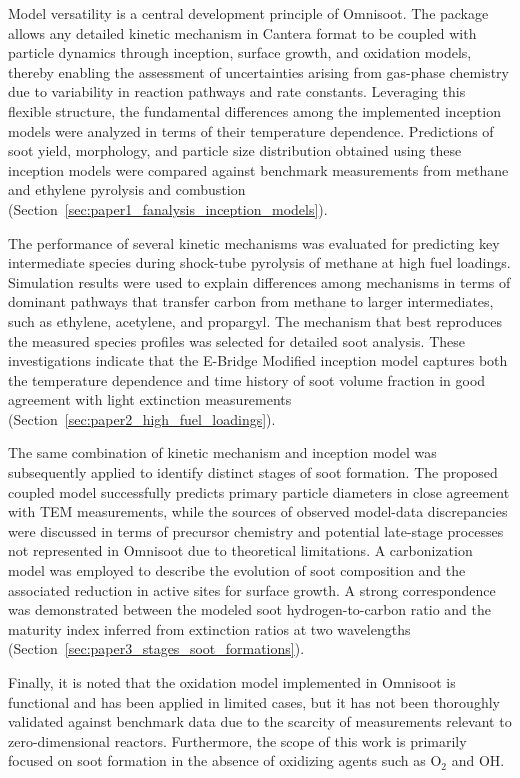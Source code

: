 Model versatility is a central development principle of Omnisoot. The package allows any detailed kinetic mechanism in Cantera format to be coupled with particle dynamics through inception, surface growth, and oxidation models, thereby enabling the assessment of uncertainties arising from gas-phase chemistry due to variability in reaction pathways and rate constants. Leveraging this flexible structure, the fundamental differences among the implemented inception models were analyzed in terms of their temperature dependence. Predictions of soot yield, morphology, and particle size distribution obtained using these inception models were compared against benchmark measurements from methane and ethylene pyrolysis and combustion (Section~\ref{sec:paper1_fanalysis_inception_models}).

The performance of several kinetic mechanisms was evaluated for predicting key intermediate species during shock-tube pyrolysis of methane at high fuel loadings. Simulation results were used to explain differences among mechanisms in terms of dominant pathways that transfer carbon from methane to larger intermediates, such as ethylene, acetylene, and propargyl. The mechanism that best reproduces the measured species profiles was selected for detailed soot analysis. These investigations indicate that the E-Bridge Modified inception model captures both the temperature dependence and time history of soot volume fraction in good agreement with light extinction measurements (Section~\ref{sec:paper2_high_fuel_loadings}).

The same combination of kinetic mechanism and inception model was subsequently applied to identify distinct stages of soot formation. The proposed coupled model successfully predicts primary particle diameters in close agreement with TEM measurements, while the sources of observed model-data discrepancies were discussed in terms of precursor chemistry and potential late-stage processes not represented in Omnisoot due to theoretical limitations. A carbonization model was employed to describe the evolution of soot composition and the associated reduction in active sites for surface growth. A strong correspondence was demonstrated between the modeled soot hydrogen-to-carbon ratio and the maturity index inferred from extinction ratios at two wavelengths (Section~\ref{sec:paper3_stages_soot_formations}).

Finally, it is noted that the oxidation model implemented in Omnisoot is functional and has been applied in limited cases, but it has not been thoroughly validated against benchmark data due to the scarcity of measurements relevant to zero-dimensional reactors. Furthermore, the scope of this work is primarily focused on soot formation in the absence of oxidizing agents such as O$_2$ and OH.

